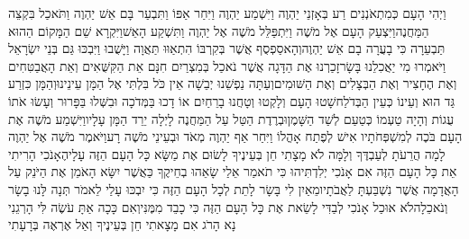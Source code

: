 \documentclass[../main/main.tex]{subfiles}
\begin{document}
\begin{multicols*}{\ncols}
וַיְהִי הָעָם כְּמִתְאֹנְנִים רַע בְּאָזְנֵי יַהְוֶה וַיִּשְׁמַע יַהְוֶה וַיִּחַר אַפּוֹ וַתִּבְעַר בָּם אֵשׁ יַהְוֶה וַתֹּאכַל בִּקְצֵה הַמַּחֲנֶה\PreVerseSpace{}וַיִּצְעַק הָעָם אֶל מֹשֶׁה וַיִּתְפַּלֵּל מֹשֶׁה אֶל יַהְוֶה וַתִּשְׁקַע הָאֵשׁ\PreVerseSpace{}וַיִּקְרָא שֵׁם הַמָּקוֹם הַהוּא תַּבְעֵרָה כִּי בָעֲרָה בָם אֵשׁ יַהְוֶה\PreVerseSpace{}וְהָאסַפְסֻף אֲשֶׁר בְּקִרְבּוֹ הִתְאַוּוּ תַּאֲוָה וַיָּשֻׁבוּ וַיִּבְכּוּ גַּם בְּנֵי יִשְׂרָאֵל וַיֹּאמְרוּ מִי יַאֲכִלֵנוּ בָּשָׂר\PreVerseSpace{}זָכַרְנוּ אֶת הַדָּגָה אֲשֶׁר נֹאכַל בְּמִצְרַיִם חִנָּם אֵת הַקִּשֻּׁאִים וְאֵת הָאֲבַטִּחִים וְאֶת הֶחָצִיר וְאֶת הַבְּצָלִים וְאֶת הַשּׁוּמִים\PreVerseSpace{}וְעַתָּה נַפְשֵׁנוּ יְבֵשָׁה אֵין כֹּל בִּלְתִּי אֶל הַמָּן עֵינֵינוּ\PreVerseSpace{}וְהַמָּן כִּזְרַע גַּד הוּא וְעֵינוֹ כְּעֵין הַבְּדֹלַח\PreVerseSpace{}שָׁטוּ הָעָם וְלָקְטוּ וְטָחֲנוּ בָרֵחַיִם אוֹ דָכוּ בַּמְּדֹכָה וּבִשְּׁלוּ בַּפָּרוּר וְעָשׂוּ אֹתוֹ עֻגוֹת וְהָיָה טַעְמוֹ כְּטַעַם לְשַׁד הַשָּׁמֶן\PreVerseSpace{}וּבְרֶדֶת הַטַּל עַל הַמַּחֲנֶה לָיְלָה יֵרֵד הַמָּן עָלָיו\PreVerseSpace{}וַיִּשְׁמַע מֹשֶׁה אֶת הָעָם בֹּכֶה לְמִשְׁפְּחֹתָיו אִישׁ לְפֶתַח אָהֳלוֹ וַיִּחַר אַף יַהְוֶה מְאֹד וּבְעֵינֵי מֹשֶׁה רָע\PreVerseSpace{}וַיֹּאמֶר מֹשֶׁה אֶל יַהְוֶה לָמָה הֲרֵעֹתָ לְעַבְדֶּךָ וְלָמָּה לֹא מָצָתִי חֵן בְּעֵינֶיךָ לָשׂוּם אֶת מַשָּׂא כָּל הָעָם הַזֶּה עָלָי\PreVerseSpace{}הֶאָנֹכִי הָרִיתִי אֵת כָּל הָעָם הַזֶּה אִם אָנֹכִי יְלִדְתִּיהוּ כִּי תֹאמַר אֵלַי שָׂאֵהוּ בְחֵיקֶךָ כַּאֲשֶׁר יִשָּׂא הָאֹמֵן אֶת הַיֹּנֵק עַל הָאֲדָמָה אֲשֶׁר נִשְׁבַּעְתָּ לַאֲבֹתָיו\PreVerseSpace{}מֵאַיִן לִי בָּשָׂר לָתֵת לְכָל הָעָם הַזֶּה כִּי יִבְכּוּ עָלַי לֵאמֹר תְּנָה לָּנוּ בָשָׂר וְנֹאכֵלָה\PreVerseSpace{}לֹא אוּכַל אָנֹכִי לְבַדִּי לָשֵׂאת אֶת כָּל הָעָם הַזֶּה כִּי כָבֵד מִמֶּנִּי\PreVerseSpace{}וְאִם כָּכָה אַתָּ עֹשֶׂה לִּי הָרְגֵנִי נָא הָרֹג אִם מָצָאתִי חֵן בְּעֵינֶיךָ וְאַל אֶרְאֶה בְּרָעָתִי\OpenSection{}\par

\end{multicols*}
\end{document}
